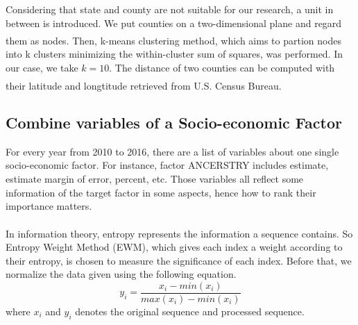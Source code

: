 \documentclass[11pt]{article}
\newcommand{\upcite}[1]{\textsuperscript{\textsuperscript{\cite{#1}}}}
\begin{document}

Considering that state and county are not suitable for our research, a unit in between is introduced. We put counties on a two-dimensional plane and regard them as nodes. Then, k-means clustering method\upcite{1}, which aims to partion nodes into k clusters minimizing the within-cluster sum of squares, was performed. In our case, we take $k = 10$. The distance of two counties can be computed with their latitude and longtitude retrieved from U.S. Census Bureau\upcite{2}. %

\subsection{Combine variables of a Socio-economic Factor}
For every year from 2010 to 2016, there are a list of variables about one single socio-economic factor. For instance, factor ANCERSTRY includes estimate, estimate margin of error, percent, etc. Those variables all reflect some information of the target factor in some aspects, hence how to rank their importance matters. 

In information theory, entropy represents the information a sequence contains\upcite{3}. So Entropy Weight Method (EWM), which gives each index a weight according to their entropy, is chosen to measure the significance of each index. Before that, we normalize the data given using the following equation.
\begin{equation}
	y_{i} = \frac{x_{i}-min(x_{i})}{max(x_{i}) - min(x_{i})}
\end{equation}
where $x_{i}$ and $y_{i}$ denotes the original sequence and processed sequence.
\end{document}
